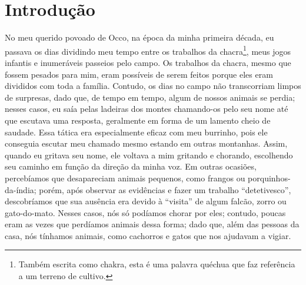 \cleardoublepage
\newpage
\ifdefined\EnableIncludeImages
\fi
\chapter*{Introdução} %

No meu querido povoado de Occo, na época da minha primeira década, eu passava os dias dividindo meu tempo entre os trabalhos da chacra\footnote{Também escrita como chakra, esta é uma palavra quéchua que faz referência a um terreno de cultivo.}, meus jogos infantis e inumeráveis passeios pelo campo.
Os trabalhos da chacra, mesmo que fossem pesados para mim, eram possíveis de serem feitos porque eles eram divididos com toda a família.
Contudo, os dias no campo não transcorriam limpos de surpresas, dado que, de tempo em tempo, algum de nossos animais se perdia; nesses casos, eu saía pelas ladeiras dos montes chamando-os pelo seu nome até que escutava uma resposta, geralmente em forma de um lamento cheio de saudade.
Essa tática era especialmente eficaz com meu burrinho, pois ele conseguia escutar meu chamado mesmo estando em outras montanhas. Assim, quando eu gritava seu nome, ele voltava a mim gritando e chorando, escolhendo seu caminho em função da direção da minha voz.
Em outras ocasiões, percebíamos que desapareciam animais pequenos, como frangos ou porquinhos-da-índia; porém, após observar as evidências e fazer um trabalho ``detetivesco'', descobríamos que sua ausência era devido à ``visita'' de algum falcão, zorro ou gato-do-mato.
Nesses casos, nós só podíamos chorar por eles; contudo, poucas eram as vezes que perdíamos animais dessa forma; dado que, além das pessoas da casa, nós tínhamos animais, como cachorros e gatos que nos ajudavam a vigiar.

